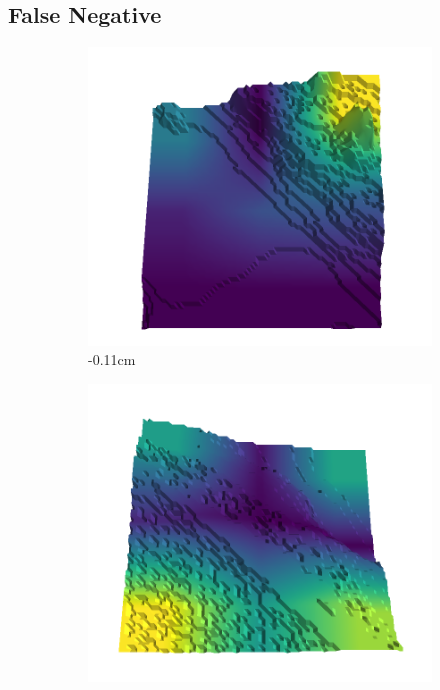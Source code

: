 \documentclass[../document.tex]{subfiles}
\begin{document}
    \subsection{False Negative}
    \begin{figure}[H]
        \centering
        \begin{subfigure}[b]{0.242\linewidth}
        \includegraphics[width=\linewidth]{../img/5/quarry/false_negative/-11-patch-3d-majavi-colormap-0.png}
        \caption{-0.11cm}
        \end{subfigure}
        \begin{subfigure}[b]{0.242\linewidth}
        \includegraphics[width=\linewidth]{../img/5/quarry/false_negative/-6-patch-3d-majavi-colormap-5.png}

\end{subfigure}
\end{figure}
\end{document}
